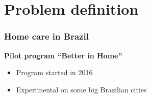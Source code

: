 \section{Problem definition}

\begin{frame}[plain]
   \sectionpage
\end{frame}

\begin{frame}
   \frametitle{Home care in Brazil}

   \textbf{Pilot program ``Better in Home''}
   \begin{itemize}
      \item Program started in 2016
      \item Experimental on some big Brazilian cities
   \end{itemize}


\end{frame}

